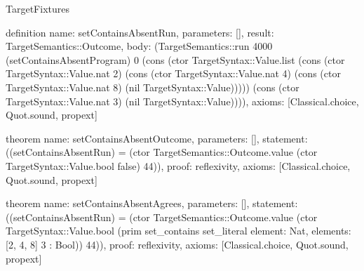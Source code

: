 \begin{lexlean}{TargetFixtures}
\begin{semanticmodule}
definition{
  name: setContainsAbsentRun,
  parameters: [],
  result: TargetSemantics::Outcome,
  body: (TargetSemantics::run 4000 (setContainsAbsentProgram) 0 (cons (ctor TargetSyntax::Value.list (cons (ctor TargetSyntax::Value.nat 2) (cons (ctor TargetSyntax::Value.nat 4) (cons (ctor TargetSyntax::Value.nat 8) (nil TargetSyntax::Value))))) (cons (ctor TargetSyntax::Value.nat 3) (nil TargetSyntax::Value)))),
  axioms: [Classical.choice, Quot.sound, propext]
}

theorem{
  name: setContainsAbsentOutcome,
  parameters: [],
  statement: ((setContainsAbsentRun) = (ctor TargetSemantics::Outcome.value (ctor TargetSyntax::Value.bool false) 44)),
  proof: reflexivity{},
  axioms: [Classical.choice, Quot.sound, propext]
}

theorem{
  name: setContainsAbsentAgrees,
  parameters: [],
  statement: ((setContainsAbsentRun) = (ctor TargetSemantics::Outcome.value (ctor TargetSyntax::Value.bool (prim set_contains set_literal{
    element: Nat,
    elements: [2, 4, 8]
  } 3 : Bool)) 44)),
  proof: reflexivity{},
  axioms: [Classical.choice, Quot.sound, propext]
}


\end{semanticmodule}
\end{lexlean}
